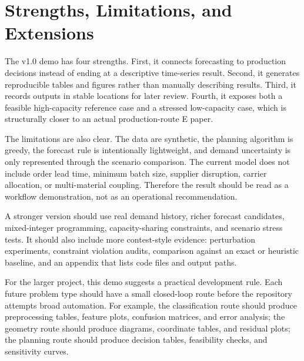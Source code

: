 \section{Strengths, Limitations, and Extensions}

The v1.0 demo has four strengths. First, it connects forecasting to production decisions instead of ending at a descriptive time-series result. Second, it generates reproducible tables and figures rather than manually describing results. Third, it records outputs in stable locations for later review. Fourth, it exposes both a feasible high-capacity reference case and a stressed low-capacity case, which is structurally closer to an actual production-route E paper.

The limitations are also clear. The data are synthetic, the planning algorithm is greedy, the forecast rule is intentionally lightweight, and demand uncertainty is only represented through the scenario comparison. The current model does not include order lead time, minimum batch size, supplier disruption, carrier allocation, or multi-material coupling. Therefore the result should be read as a workflow demonstration, not as an operational recommendation.

A stronger version should use real demand history, richer forecast candidates, mixed-integer programming, capacity-sharing constraints, and scenario stress tests. It should also include more contest-style evidence: perturbation experiments, constraint violation audits, comparison against an exact or heuristic baseline, and an appendix that lists code files and output paths.

For the larger project, this demo suggests a practical development rule. Each future problem type should have a small closed-loop route before the repository attempts broad automation. For example, the classification route should produce preprocessing tables, feature plots, confusion matrices, and error analysis; the geometry route should produce diagrams, coordinate tables, and residual plots; the planning route should produce decision tables, feasibility checks, and sensitivity curves.
